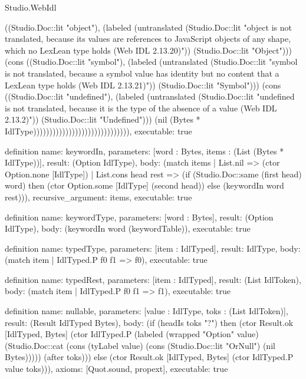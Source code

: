 \begin{lexlean}{Studio.WebIdl}
\begin{semanticmodule}
{((Studio.Doc::lit "object"), (labeled (untranslated (Studio.Doc::lit "object is not translated, because its values are references to JavaScript objects of any shape, which no LexLean type holds (Web IDL 2.13.20)")) (Studio.Doc::lit "Object"))) (cons ((Studio.Doc::lit "symbol"), (labeled (untranslated (Studio.Doc::lit "symbol is not translated, because a symbol value has identity but no content that a LexLean type holds (Web IDL 2.13.21)")) (Studio.Doc::lit "Symbol"))) (cons ((Studio.Doc::lit "undefined"), (labeled (untranslated (Studio.Doc::lit "undefined is not translated, because it is the type of the absence of a value (Web IDL 2.13.2)")) (Studio.Doc::lit "Undefined"))) (nil (Bytes * IdlType)))))))))))))))))))))))))))))),
  executable: true
}

definition{
  name: keywordIn,
  parameters: [word : Bytes, items : (List (Bytes * IdlType))],
  result: (Option IdlType),
  body: (match items
    | List.nil => (ctor Option.none [IdlType])
    | List.cons head rest => (if (Studio.Doc::same (first head) word) then (ctor Option.some [IdlType] (second head)) else (keywordIn word rest))),
  recursive_argument: items,
  executable: true
}

definition{
  name: keywordType,
  parameters: [word : Bytes],
  result: (Option IdlType),
  body: (keywordIn word (keywordTable)),
  executable: true
}

definition{
  name: typedType,
  parameters: [item : IdlTyped],
  result: IdlType,
  body: (match item
    | IdlTyped.P f0 f1 => f0),
  executable: true
}

definition{
  name: typedRest,
  parameters: [item : IdlTyped],
  result: (List IdlToken),
  body: (match item
    | IdlTyped.P f0 f1 => f1),
  executable: true
}

definition{
  name: nullable,
  parameters: [value : IdlType, toks : (List IdlToken)],
  result: (Result IdlTyped Bytes),
  body: (if (headIs toks "?") then (ctor Result.ok [IdlTyped, Bytes] (ctor IdlTyped.P (labeled (wrapped "Option" value) (Studio.Doc::cat (cons (tyLabel value) (cons (Studio.Doc::lit "OrNull") (nil Bytes))))) (after toks))) else (ctor Result.ok [IdlTyped, Bytes] (ctor IdlTyped.P value toks))),
  axioms: [Quot.sound, propext],
  executable: true
}


\end{semanticmodule}
\end{lexlean}
